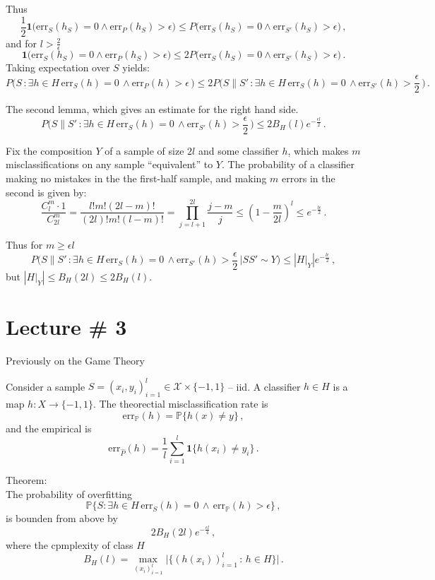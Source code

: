 \documentclass[a4paper]{article}
\newcommand{\err}{\text{err}}
\newcommand{\one}{\mathbf{1}}
\newcommand{\pr}{\mathbb{P}}
\begin{document}
Thus
\[ \frac{1}{2} \one\bigl( \err_S(h_S) = 0 \wedge \err_P(h_S) > \epsilon \bigr)
   \leq P\bigl( \err_S(h_S) = 0 \wedge \err_{S'}(h_S) > \epsilon \bigr) \,, \]
and for $l > \frac{2}{\epsilon}$
\[ \one\bigl( \err_S(h_S) = 0 \wedge \err_P(h_S) > \epsilon \bigr)
   \leq 2 P\bigl( \err_S(h_S) = 0 \wedge \err_{S'}(h_S) > \epsilon \bigr) \,. \]
Taking expectation over $S$ yields:
\[ P\bigl( S\,: \exists h\in H\, \err_S(h) = 0\, \wedge \err_P(h) > \epsilon\, \bigr)
   \leq 2 P\bigl( S\|S'\,: \exists h\in H\, \err_S(h) = 0\, \wedge \err_{S'}(h) > \frac{\epsilon}{2}\, \bigr) \,. \]

The second lemma, which gives an estimate for the right hand side.
\[ 
P\bigl( S\|S'\,: \exists h\in H\, \err_S(h) = 0\, \wedge \err_{S'}(h) > \frac{\epsilon}{2}\, \bigr)
	\leq 2B_H(l) e^{-\frac{\epsilon l}{2}}\,. \]

Fix the composition $Y$ of a sample of size $2l$ and some classifier $h$, which makes $m$
misclassifications on any sample ``equivalent'' to $Y$.
The probability of a classifier making no mistakes in the the first-half sample, and 
making $m$ errors in the second is given by:
\[ \frac{ C_l^m \cdot 1 }{C_{2l}^m}
		= \frac{ l! m! (2l-m)!}{ (2l)! m! (l-m)! }
		= \prod_{j=l+1}^{2l} \frac{j-m}{j}
		\leq (1-\frac{m}{2l})^l \leq e^{-\frac{l \epsilon}{2}} \,. \]

Thus for $m\geq \epsilon l$
\[ P\bigl( S\|S'\,: \exists h\in H\, \err_S(h) = 0\,
					\wedge \err_{S'}(h) > \frac{\epsilon}{2}\, \rvert SS'\sim Y\bigr)
		\leq |H\rvert_Y| e^{-\frac{l \epsilon}{2}} \,, \]
but $|H\rvert_Y| \leq B_H(2l)\leq 2B_H(l)$.



\section{Lecture \# 3} %
\label{sec:lecture_#_3}

Previously on the Game Theory

Consider a sample $S = (x_i, y_i)_{i=1}^l\in \mathcal{X}\times\{-1,1\}$ -- iid.
A classifier $h\in H$ is a map $h:X\to\{-1,1\}$.
The theorectial misclassification rate is 
\[\err_\pr(h) = \pr\{ h(x) \neq y \} \,,\]
and the empirical is
\[\err_{\hat{P}}(h) = \frac{1}{l} \sum_{i=1}^l \one\{ h(x_i) \neq y_i \} \,.\]


\notation Theorem:\hfill\\
The probability of overfitting
\[ \pr\{ S : \exists h\in H\, \err_S(h) = 0\,\wedge\, \err_\pr(h) > \epsilon \}\,,\]
is bounden from above by 
\[  2B_H(2l) e^{-\frac{\epsilon l}{4}} \,, \]
where the cpmplexity of class $H$ 
\[B_H(l) = \max_{(x_i)_{i=1}^l} \bigl|\{ (h(x_i))_{i=1}^l\,:\,h\in H \}\bigr| \,.\]
\end{document}
